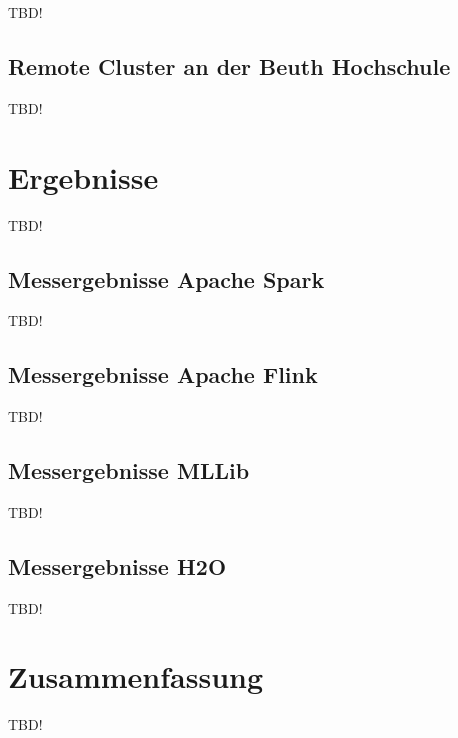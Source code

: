 TBD!

\subsection{Remote Cluster an der Beuth Hochschule}
\label{section:remote}

TBD!

\section{Ergebnisse}
\label{section:ergebnisse}

TBD!

\subsection{Messergebnisse Apache Spark}
\label{section:spark eval}

TBD!

\subsection{Messergebnisse Apache Flink}
\label{section:mllib arch}

TBD!

\subsection{Messergebnisse MLLib}
\label{section:mllib arch}

TBD!

\subsection{Messergebnisse H2O}
\label{section:mllib arch}

TBD!



\section{Zusammenfassung}
\label{section:zusammen}



TBD!
